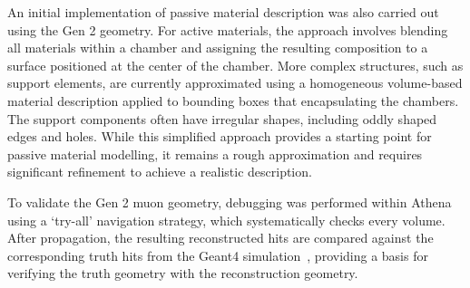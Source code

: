 An initial implementation of passive material description was also carried out using the Gen 2 geometry. For active materials, the approach involves blending all materials within a chamber and assigning the resulting composition to a surface positioned at the center of the chamber. More complex structures, such as support elements, are currently approximated using a homogeneous volume-based material description applied to bounding boxes that encapsulating the chambers. The support components often have irregular shapes, including oddly shaped edges and holes. While this simplified approach provides a starting point for passive material modelling, it remains a rough approximation and requires significant refinement to achieve a realistic description.

To validate the Gen 2 muon geometry, debugging was performed within Athena using a `try-all' navigation strategy, which systematically checks every volume. After propagation, the resulting reconstructed hits are compared against the corresponding truth hits from the Geant4 simulation~\cite{Agostinelli:2002hh}, providing a basis for verifying the truth geometry with the reconstruction geometry.

